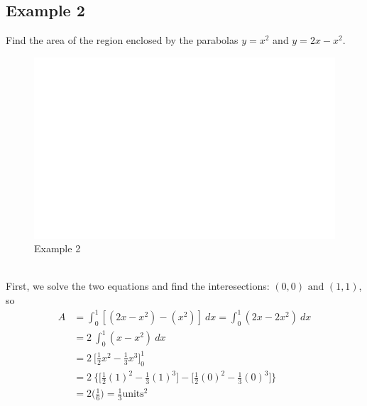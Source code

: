 \documentclass[11pt]{article}
\begin{document}
\subsection{Example 2}
Find the area of the region enclosed by the parabolas $y = x^2$ and $y = 2x - x^2$.\\
\begin{figure}[h!]
    \centering
    \includegraphics[scale=0.5]{fig_6_2.png}
    \caption{Example 2}
    \label{Label}
\end{figure}
\\[8pt]
First, we solve the two equations and find the interesections: $ (0,0) \text{ and } (1,1) $, so
\begin{align*}
    A &= \int_{0}^{1}[(2x-x^2) - (x^2)]\ dx
    = \int_{0}^{1}(2x-2x^2)\ dx\\
    &= 2\ \int_{0}^{1}(x-x^2)\ dx\\
    &= 2\ \Big[\frac{1}{2}x^2 - \frac{1}{3}x^3\Big]_0^1\\
    &= 2\ \bigg\{ \Big[ \frac{1}{2} (1)^2 - \frac{1}{3} (1)^3 \Big] - \Big[ \frac{1}{2} (0)^2 - \frac{1}{3} (0)^3 \Big] \bigg\}\\
    &= 2\Big( \frac{1}{6} \Big) = \frac{1}{3}\text{units}^2
\end{align*}
\end{document}
